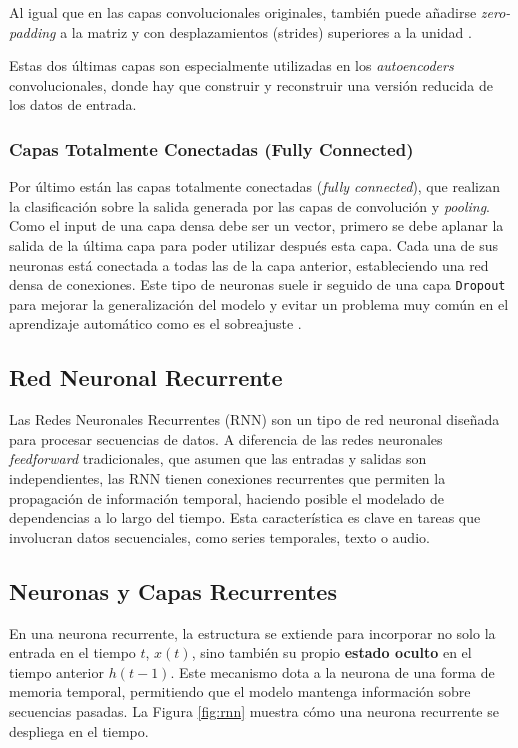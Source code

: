 Al igual que en las capas convolucionales originales, también puede añadirse \textit{zero-padding} a la matriz y con desplazamientos (strides) superiores a la unidad \citep{pajares2021aprendizaje}.

Estas dos últimas capas son especialmente utilizadas en los \textit{autoencoders} convolucionales, donde hay que construir y reconstruir una versión reducida de los datos de entrada.

\subsubsection*{Capas Totalmente Conectadas (Fully Connected)}

Por último están las capas totalmente conectadas (\textit{fully connected}), que realizan la clasificación sobre la salida generada por las capas de convolución y \textit{pooling}. Como el input de una capa densa debe ser un vector, primero se debe aplanar la salida de la última capa para poder utilizar después esta capa. Cada una de sus neuronas está conectada a todas las de la capa anterior, estableciendo una red densa de conexiones. Este tipo de neuronas suele ir seguido de una capa \lstinline|Dropout| para mejorar la generalización del modelo y evitar un problema muy común en el aprendizaje automático como es el sobreajuste \citep{hossain2019classification}.



\subsection{Red Neuronal Recurrente}


Las Redes Neuronales Recurrentes (RNN) son un tipo de red neuronal diseñada para procesar secuencias de datos. A diferencia de las redes neuronales \textit{feedforward} tradicionales, que asumen que las entradas y salidas son independientes, las RNN tienen conexiones recurrentes que permiten la propagación de información temporal, haciendo posible el modelado de dependencias a lo largo del tiempo. Esta característica es clave en tareas que involucran datos secuenciales, como series temporales, texto o audio.

\subsection*{Neuronas y Capas Recurrentes}

En una neurona recurrente, la estructura se extiende para incorporar no solo la entrada en el tiempo \( t \), \( x(t) \), sino también su propio \textbf{estado oculto} en el tiempo anterior \( h(t-1) \). Este mecanismo dota a la neurona de una forma de memoria temporal, permitiendo que el modelo mantenga información sobre secuencias pasadas. La Figura \ref{fig:rnn} muestra cómo una neurona recurrente se despliega en el tiempo.


